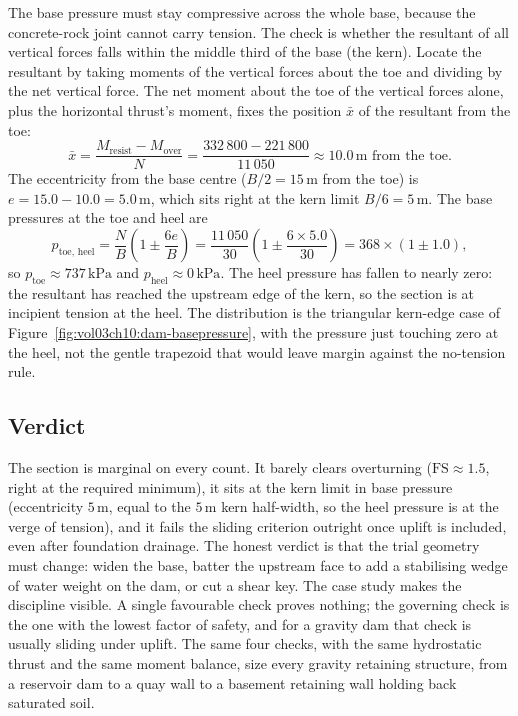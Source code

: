 The base pressure must stay compressive across the whole base, because
the concrete-rock joint cannot carry tension. The check is whether the
resultant of all vertical forces falls within the middle third of the
base (the kern). Locate the resultant by taking moments of the vertical
forces about the toe and dividing by the net vertical force. The net
moment about the toe of the vertical forces alone, plus the horizontal
thrust's moment, fixes the position $\bar{x}$ of the resultant from the
toe:
\[
\bar{x} = \frac{M_{\text{resist}} - M_{\text{over}}}{N}
= \frac{332\,800 - 221\,800}{11\,050}
\approx 10.0\,\si{\meter} \text{ from the toe.}
\]
The eccentricity from the base centre ($B/2 = 15\,\si{\meter}$ from the
toe) is $e = 15.0 - 10.0 = 5.0\,\si{\meter}$, which sits right at the kern
limit $B/6 = 5\,\si{\meter}$. The base pressures at the toe and heel are
\[
p_{\text{toe, heel}} = \frac{N}{B}\left(1 \pm \frac{6e}{B}\right)
= \frac{11\,050}{30}\left(1 \pm \frac{6 \times 5.0}{30}\right)
= 368 \times (1 \pm 1.0),
\]
so $p_{\text{toe}} \approx 737\,\text{kPa}$ and $p_{\text{heel}} \approx
0\,\text{kPa}$. The heel pressure has fallen to nearly zero: the
resultant has reached the upstream edge of the kern, so the section is at
incipient tension at the heel. The distribution is the triangular
kern-edge case of Figure~\ref{fig:vol03ch10:dam-basepressure}, with the
pressure just touching zero at the heel, not the gentle trapezoid that
would leave margin against the no-tension rule.





\subsection{Verdict}

The section is marginal on every count. It barely clears overturning
($\mathrm{FS} \approx 1.5$, right at the required minimum), it sits at the
kern limit in base pressure (eccentricity $5\,\si{\meter}$, equal to the
$5\,\si{\meter}$ kern half-width, so the heel pressure is at the verge of
tension), and it fails the sliding criterion outright once uplift is
included, even after foundation drainage. The honest verdict is
that the trial geometry must change: widen the base, batter the upstream
face to add a stabilising wedge of water weight on the dam, or cut a
shear key. The case study makes the discipline visible. A single
favourable check proves nothing; the governing check is the one with the
lowest factor of safety, and for a gravity dam that check is usually
sliding under uplift. The same four checks, with the same hydrostatic
thrust and the same moment balance, size every gravity retaining
structure, from a reservoir dam to a quay wall to a basement retaining
wall holding back saturated soil.


